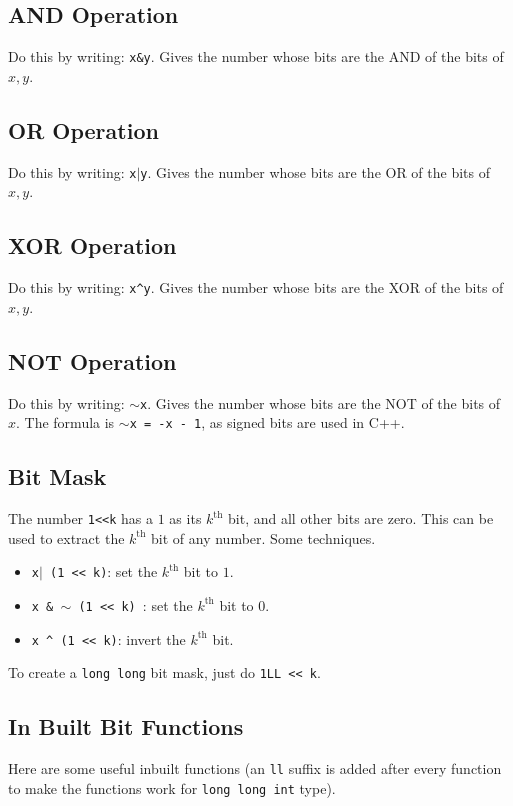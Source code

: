 \documentclass[12pt,a4paper]{amsart}
\numberwithin{equation}{section}
\theoremstyle{definition}
\begin{document}
\subsection{AND Operation} Do this by writing: \verb|x&y|. Gives the number whose bits are the AND of the bits of $x,y$.

\subsection{OR Operation} Do this by writing: \verb|x|$|$\verb|y|. Gives the number whose bits are the OR of the bits of $x,y$.

\subsection{XOR Operation} Do this by writing: \verb|x^y|. Gives the number whose bits are the XOR of the bits of $x,y$.

\subsection{NOT Operation} Do this by writing: $\sim$\verb|x|. Gives the number whose bits are the NOT of the bits of $x$. The formula is $\sim$\verb|x = -x - 1|, as signed bits are used in C++.

\subsection{Bit Mask} The number \verb|1<<k| has a $1$ as its $k^\text{th}$ bit, and all other bits are zero. This can be used to extract the $k^{\text{th}}$ bit of any number. Some techniques. 
\begin{itemize}
    \item \verb|x|$|$\verb| (1 << k)|: set the $k^\text{th}$ bit to $1$.
    \item \verb|x & |$\sim$\verb| (1 << k) |: set the $k^\text{th}$ bit to $0$.
    \item \verb|x ^ (1 << k)|: invert the $k^\text{th}$ bit.
\end{itemize}
To create a \verb|long long| bit mask, just do \verb|1LL << k|.

\subsection{In Built Bit Functions} Here are some useful inbuilt functions (an \verb|ll| suffix is added after every function to make the functions work for \verb|long long int| type). 
\end{document}
